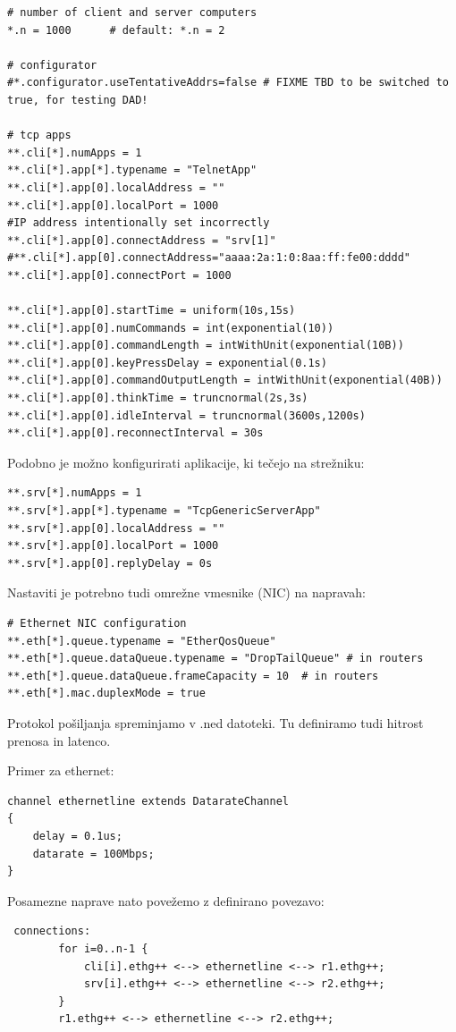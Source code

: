 \documentclass[11pt,a4paper,slovene]{myarticle}
\begin{document}
\begin{lstlisting}
# number of client and server computers
*.n = 1000      # default: *.n = 2

# configurator
#*.configurator.useTentativeAddrs=false # FIXME TBD to be switched to true, for testing DAD!

# tcp apps
**.cli[*].numApps = 1
**.cli[*].app[*].typename = "TelnetApp"
**.cli[*].app[0].localAddress = ""
**.cli[*].app[0].localPort = 1000
#IP address intentionally set incorrectly
**.cli[*].app[0].connectAddress = "srv[1]"
#**.cli[*].app[0].connectAddress="aaaa:2a:1:0:8aa:ff:fe00:dddd"
**.cli[*].app[0].connectPort = 1000

**.cli[*].app[0].startTime = uniform(10s,15s)
**.cli[*].app[0].numCommands = int(exponential(10))
**.cli[*].app[0].commandLength = intWithUnit(exponential(10B))
**.cli[*].app[0].keyPressDelay = exponential(0.1s)
**.cli[*].app[0].commandOutputLength = intWithUnit(exponential(40B))
**.cli[*].app[0].thinkTime = truncnormal(2s,3s)
**.cli[*].app[0].idleInterval = truncnormal(3600s,1200s)
**.cli[*].app[0].reconnectInterval = 30s
\end{lstlisting}

Podobno je možno konfigurirati aplikacije, ki tečejo na strežniku:
\begin{lstlisting}
**.srv[*].numApps = 1
**.srv[*].app[*].typename = "TcpGenericServerApp"
**.srv[*].app[0].localAddress = ""
**.srv[*].app[0].localPort = 1000
**.srv[*].app[0].replyDelay = 0s
\end{lstlisting}


Nastaviti je potrebno tudi omrežne vmesnike (NIC) na napravah:
\begin{lstlisting}
# Ethernet NIC configuration
**.eth[*].queue.typename = "EtherQosQueue"
**.eth[*].queue.dataQueue.typename = "DropTailQueue" # in routers
**.eth[*].queue.dataQueue.frameCapacity = 10  # in routers
**.eth[*].mac.duplexMode = true
\end{lstlisting}


Protokol pošiljanja spreminjamo v .ned datoteki. Tu definiramo tudi hitrost prenosa in latenco.

Primer za ethernet:
\begin{lstlisting}
channel ethernetline extends DatarateChannel
{
    delay = 0.1us;
    datarate = 100Mbps;
}
\end{lstlisting}

Posamezne naprave nato povežemo z definirano povezavo:
\begin{lstlisting}
 connections:
        for i=0..n-1 {
            cli[i].ethg++ <--> ethernetline <--> r1.ethg++;
            srv[i].ethg++ <--> ethernetline <--> r2.ethg++;
        }
        r1.ethg++ <--> ethernetline <--> r2.ethg++;
\end{lstlisting}
\end{document}
